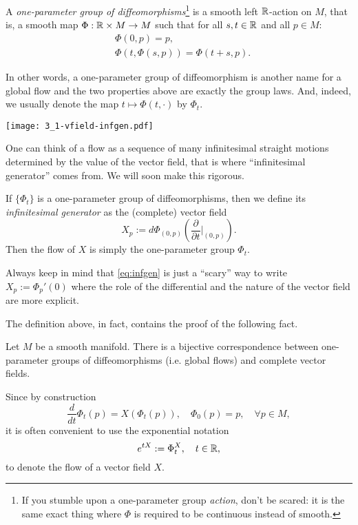 \begin{definition}
  A \emph{one-parameter group of diffeomorphisms}\footnote{If you stumble upon a one-parameter group \emph{action}, don't be scared: it is the same exact thing where $\Phi$ is required to be continuous instead of smooth.} is a smooth left $\mathbb{R}$-action on $M$, that is, a smooth map $\Phi:\mathbb{R}\times M \to M$ such that for all $s,t\in\mathbb{R}$ and all $p\in M$:
  \begin{align}
    &\Phi(0,p) = p,\\
    &\Phi(t, \Phi(s, p)) = \Phi(t+s, p).
  \end{align}
  
  In other words, a one-parameter group of diffeomorphism is another name for a global flow and the two properties above are exactly the group laws.
  And, indeed, we usually denote the map $t\mapsto\Phi(t,\cdot)$ by $\Phi_t$.

  \begin{marginfigure}
    \texttt{[image: 3\_1-vfield-infgen.pdf]}
    \label{fig:3_1-vfield-infgen}
    \caption{One can think of a flow as a sequence of many infinitesimal straight motions determined by the value of the vector field, that is where ``infinitesimal generator'' comes from. We will soon make this rigorous.}
  \end{marginfigure}
  If $\{\Phi_t\}$ is a one-parameter group of diffeomorphisms, then we define its \emph{infinitesimal generator} as the (complete) vector field
  \begin{equation}\label{eq:infgen}
    X_p := d\Phi_{(0,p)}\left(\frac{\partial}{\partial t}\Big|_{(0,p)}\right).
  \end{equation}
  Then the flow of $X$ is simply the one-parameter group $\Phi_t$.

  Always keep in mind that \eqref{eq:infgen} is just a ``scary'' way to write $X_p := \Phi_p'(0)$ where the role of the differential and the nature of the vector field are more explicit.
\end{definition}

The definition above, in fact, contains the proof of the following fact.
\begin{proposition}
  Let $M$ be a smooth manifold. There is a bijective correspondence between one-parameter groups of diffeomorphisms (i.e. global flows) and complete vector fields.
\end{proposition}

\begin{notation}
  Since by construction
  \begin{equation}
    \frac{d}{d t}\Phi_t(p) = X(\Phi_t(p)), \quad
    \Phi_0(p) = p, \quad \forall p\in M,
  \end{equation}
  it is often convenient to use the exponential notation
  \begin{equation}
    e^{t X} := \Phi^X_t, \quad t\in\mathbb{R},
  \end{equation}
  to denote the flow of a vector field $X$.
\end{notation}

